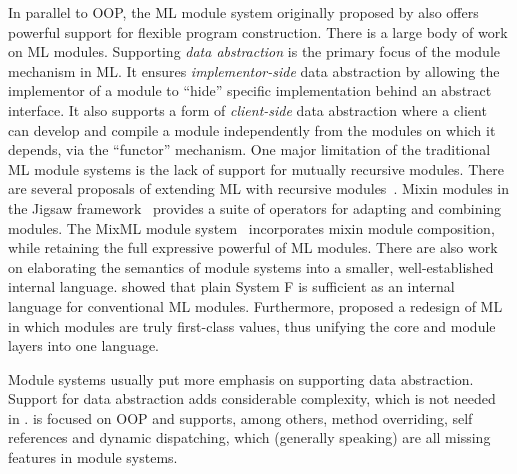 In parallel to OOP, the ML module system originally proposed by
\citet{MacQueen_1984} also offers powerful support for flexible program
construction. There is a large body of work on ML modules. Supporting
\emph{data abstraction} is the primary focus of the module mechanism in ML. It
ensures \emph{implementor-side} data abstraction by allowing the implementor
of a module to ``hide'' specific implementation behind an abstract interface. It
also supports a form of \emph{client-side} data abstraction where a client can
develop and compile a module independently from the modules on which it depends,
via the ``functor'' mechanism. One major limitation of the traditional ML module
systems is the lack of support for mutually recursive modules. There are several
proposals of extending ML with recursive
modules~\citep{Crary_1999,Rossberg_2013, Russo_2001}. Mixin modules in the
Jigsaw framework~\citep{Bracha92modularitymeets} provides a suite of operators
for adapting and combining modules. The MixML module
system~\citep{Rossberg_2013} incorporates mixin module composition, while
retaining the full expressive powerful of ML modules. There are also work on
elaborating the semantics of module systems into a smaller, well-established
internal language. \citet{ROSSBERG_2014} showed that plain System F is
sufficient as an internal language for conventional ML modules.
Furthermore, \citet{Rossberg_2015} proposed a redesign of ML in which modules are truly
first-class values, thus unifying the core and module layers into one language.

Module systems usually put more emphasis on supporting data abstraction. Support
for data abstraction adds considerable complexity, which is not needed in
\sedel. \sedel is focused on OOP and supports, among others, method overriding,
self references and dynamic dispatching, which (generally speaking) are all
missing features in module systems.




